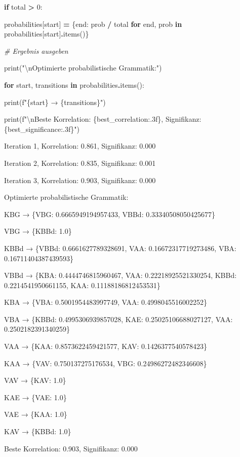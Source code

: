 \documentclass[
]{article}
\begin{document}
\textbf{if} total \textbf{\textgreater{}} 0:

probabilities{[}start{]} \textbf{=} \{end: prob \textbf{/} total
\textbf{for} end, prob \textbf{in}
probabilities{[}start{]}\textbf{.}items()\}

\emph{\# Ergebnis ausgeben}

print("\textbackslash nOptimierte probabilistische Grammatik:")

\textbf{for} start, transitions \textbf{in}
probabilities\textbf{.}items():

print(f"\{start\} → \{transitions\}")

print(f"\textbackslash nBeste Korrelation: \{best\_correlation:.3f\},
Signifikanz: \{best\_significance:.3f\}")

Iteration 1, Korrelation: 0.861, Signifikanz: 0.000

Iteration 2, Korrelation: 0.835, Signifikanz: 0.001

Iteration 3, Korrelation: 0.903, Signifikanz: 0.000

Optimierte probabilistische Grammatik:

KBG → \{\textquotesingle VBG\textquotesingle: 0.6665949194957433,
\textquotesingle VBBd\textquotesingle: 0.33340508050425677\}

VBG → \{\textquotesingle KBBd\textquotesingle: 1.0\}

KBBd → \{\textquotesingle VBBd\textquotesingle: 0.6661627789328691,
\textquotesingle VAA\textquotesingle: 0.16672317719273486,
\textquotesingle VBA\textquotesingle: 0.16711404387439593\}

VBBd → \{\textquotesingle KBA\textquotesingle: 0.4444746815960467,
\textquotesingle VAA\textquotesingle: 0.22218925521330254,
\textquotesingle KBBd\textquotesingle: 0.2214541950661155,
\textquotesingle KAA\textquotesingle: 0.11188186812453531\}

KBA → \{\textquotesingle VBA\textquotesingle: 0.5001954483997749,
\textquotesingle VAA\textquotesingle: 0.4998045516002252\}

VBA → \{\textquotesingle KBBd\textquotesingle: 0.4995306939857028,
\textquotesingle KAE\textquotesingle: 0.25025106688027127,
\textquotesingle VAA\textquotesingle: 0.2502182391340259\}

VAA → \{\textquotesingle KAA\textquotesingle: 0.8573622459421577,
\textquotesingle KAV\textquotesingle: 0.1426377540578423\}

KAA → \{\textquotesingle VAV\textquotesingle: 0.750137275176534,
\textquotesingle VBG\textquotesingle: 0.24986272482346608\}

VAV → \{\textquotesingle KAV\textquotesingle: 1.0\}

KAE → \{\textquotesingle VAE\textquotesingle: 1.0\}

VAE → \{\textquotesingle KAA\textquotesingle: 1.0\}

KAV → \{\textquotesingle KBBd\textquotesingle: 1.0\}

Beste Korrelation: 0.903, Signifikanz: 0.000
\end{document}
